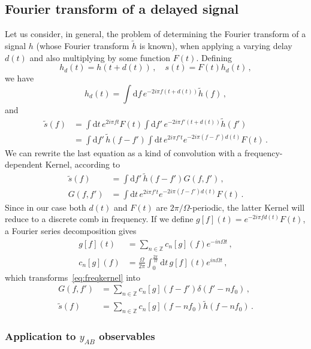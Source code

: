 \documentclass[aps,showpacs,twocolumn,prd,superscriptaddress,nofootinbib]{revtex4}
\newcommand{\be}{\begin{equation}}
\newcommand{\ee}{\end{equation}}
\newcommand\ud{{\mathrm{d}}}
\newcommand{\nn}{\nonumber}
\begin{document}
\subsection*{Fourier transform of a delayed signal}

Let us consider, in general, the problem of determining the Fourier transform of a signal $h$ (whose Fourier transform $\tilde{h}$ is known), when applying a varying delay $d(t)$ and also multiplying by some function $F(t)$. Defining
%
\be
	h_{d}(t) = h(t+d(t)) \,, \quad s(t) = F(t)h_{d}(t) \,,
\ee
%
we have
%
\be
	h_{d}(t) = \int \ud f \, e^{-2i\pi f (t+d(t))}\tilde{h}(f) \,,
\ee
%
and
%
\begin{align}
	\tilde{s}(f) &= \int \ud t \, e^{2i\pi f t} F(t)  \int \ud f' \, e^{-2i\pi f' (t+d(t))}\tilde{h}(f') \nn\\
	&= \int \ud f' \, \tilde{h}(f-f') \int \ud t \, e^{2i\pi f' t} e^{-2i\pi (f-f') d(t)} F(t) \,.
\end{align}
%
We can rewrite the last equation as a kind of convolution with a frequency-dependent Kernel, according to
%
\begin{align}\label{eq:freqkernel}
	\tilde{s}(f) &= \int \ud f' \, \tilde{h}(f-f') G(f,f') \,, \nn\\
	G(f,f') &= \int \ud t \, e^{2i\pi f' t} e^{-2i\pi (f-f') d(t)} F(t) \,.
\end{align}
%
Since in our case both $d(t)$ and $F(t)$ are $2\pi/\Omega$-periodic, the latter Kernel will reduce to a discrete comb in frequency. If we define $g[f](t) = e^{-2i\pi f d(t)} F(t)$, a Fourier series decomposition gives
%
\begin{align}
	g[f](t) &= \sum\limits_{n\in \mathbb{Z}} c_{n}[g](f) e^{-i n\Omega t} \,, \nn\\
	c_{n}[g](f) &= \frac{\Omega}{2\pi}\int_{0}^{\frac{2\pi}{\Omega}} \ud t \, g[f](t) e^{i n \Omega t} \,,
\end{align}
%
which transforms~\eqref{eq:freqkernel} into
%
\begin{align}
	G(f,f') &= \sum\limits_{n\in \mathbb{Z}} c_{n}[g](f-f') \delta\left(f' - n f_{0}\right) \,, \nn\\
	\tilde{s}(f) &= \sum\limits_{n\in \mathbb{Z}} c_{n}[g]\left(f - n f_{0}\right) \tilde{h}\left(f - n f_{0}\right) \,.
\end{align}
%


\subsubsection*{Application to $y_{AB}$ observables}
\end{document}
